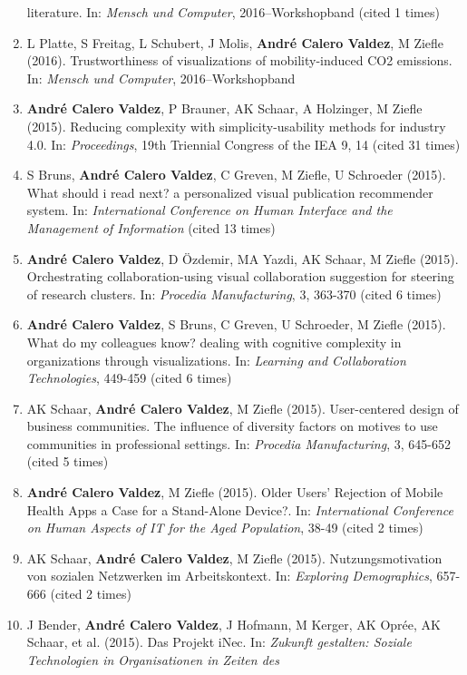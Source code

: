 \documentclass[11pt,a4paper,sans]{moderncv}
\begin{document}
\begin{enumerate}
  literature. In: \emph{Mensch und Computer}, 2016--Workshopband (cited
  1 times)
\item
  L Platte, S Freitag, L Schubert, J Molis, \textbf{André Calero
  Valdez}, M Ziefle (2016). Trustworthiness of visualizations of
  mobility-induced CO2 emissions. In: \emph{Mensch und Computer},
  2016--Workshopband
\item
  \textbf{André Calero Valdez}, P Brauner, AK Schaar, A Holzinger, M
  Ziefle (2015). Reducing complexity with simplicity-usability methods
  for industry 4.0. In: \emph{Proceedings}, 19th Triennial Congress of
  the IEA 9, 14 (cited 31 times)
\item
  S Bruns, \textbf{André Calero Valdez}, C Greven, M Ziefle, U Schroeder
  (2015). What should i read next? a personalized visual publication
  recommender system. In: \emph{International Conference on Human
  Interface and the Management of Information} (cited 13 times)
\item
  \textbf{André Calero Valdez}, D Özdemir, MA Yazdi, AK Schaar, M Ziefle
  (2015). Orchestrating collaboration-using visual collaboration
  suggestion for steering of research clusters. In: \emph{Procedia
  Manufacturing}, 3, 363-370 (cited 6 times)
\item
  \textbf{André Calero Valdez}, S Bruns, C Greven, U Schroeder, M Ziefle
  (2015). What do my colleagues know? dealing with cognitive complexity
  in organizations through visualizations. In: \emph{Learning and
  Collaboration Technologies}, 449-459 (cited 6 times)
\item
  AK Schaar, \textbf{André Calero Valdez}, M Ziefle (2015).
  User-centered design of business communities. The influence of
  diversity factors on motives to use communities in professional
  settings. In: \emph{Procedia Manufacturing}, 3, 645-652 (cited 5
  times)
\item
  \textbf{André Calero Valdez}, M Ziefle (2015). Older Users' Rejection
  of Mobile Health Apps a Case for a Stand-Alone Device?. In:
  \emph{International Conference on Human Aspects of IT for the Aged
  Population}, 38-49 (cited 2 times)
\item
  AK Schaar, \textbf{André Calero Valdez}, M Ziefle (2015).
  Nutzungsmotivation von sozialen Netzwerken im Arbeitskontext. In:
  \emph{Exploring Demographics}, 657-666 (cited 2 times)
\item
  J Bender, \textbf{André Calero Valdez}, J Hofmann, M Kerger, AK Oprée,
  AK Schaar, et al. (2015). Das Projekt iNec. In: \emph{Zukunft
  gestalten: Soziale Technologien in Organisationen in Zeiten des
}
\end{enumerate}
\end{document}

